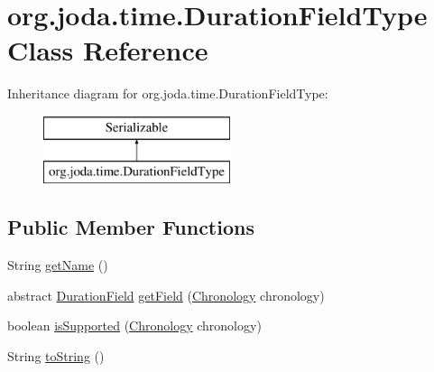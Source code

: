 \hypertarget{classorg_1_1joda_1_1time_1_1_duration_field_type}{\section{org.\-joda.\-time.\-Duration\-Field\-Type Class Reference}
\label{classorg_1_1joda_1_1time_1_1_duration_field_type}
}
Inheritance diagram for org.\-joda.\-time.\-Duration\-Field\-Type\-:\begin{figure}[H]
\begin{center}
\leavevmode
\includegraphics[height=2.000000cm]{classorg_1_1joda_1_1time_1_1_duration_field_type}
\end{center}
\end{figure}
\subsection*{Public Member Functions}
\begin{DoxyCompactItemize}
\item 
String \hyperlink{classorg_1_1joda_1_1time_1_1_duration_field_type_ae2bf4a073b1c8883095714895f753f17}{get\-Name} ()
\item 
abstract \hyperlink{classorg_1_1joda_1_1time_1_1_duration_field}{Duration\-Field} \hyperlink{classorg_1_1joda_1_1time_1_1_duration_field_type_a2c04f7d6c5f7163985d78b47ede78025}{get\-Field} (\hyperlink{classorg_1_1joda_1_1time_1_1_chronology}{Chronology} chronology)
\item 
boolean \hyperlink{classorg_1_1joda_1_1time_1_1_duration_field_type_a00d1930be731d975025b71249b77c5e6}{is\-Supported} (\hyperlink{classorg_1_1joda_1_1time_1_1_chronology}{Chronology} chronology)
\item 
String \hyperlink{classorg_1_1joda_1_1time_1_1_duration_field_type_aac276eeba1fe620c58f6a8504253b015}{to\-String} ()
\end{DoxyCompactItemize}
